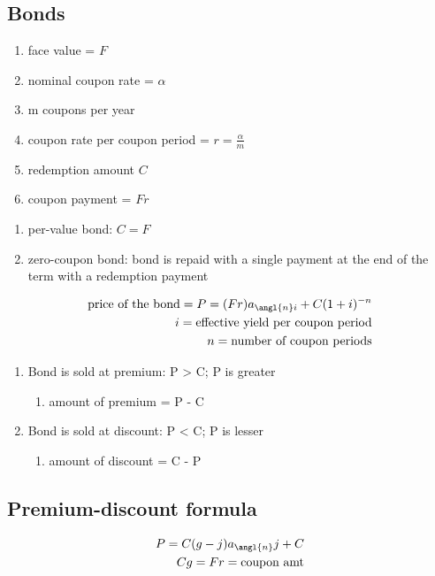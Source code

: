 \documentclass[12pt]{article}
\begin{document}
\subsection{Bonds}
\begin{enumerate}
	\item face value = $F$
	\item nominal coupon rate = $\alpha$
	\item m coupons per year 
	\item coupon rate per coupon period = $r = \frac{\alpha}{m}$
	\item redemption amount $C$
	\item coupon payment = $Fr$
	
\end{enumerate}
\begin{enumerate}
	\item per-value bond: $C = F$
	\item zero-coupon bond: bond is repaid with a single payment at the end of the term with a redemption payment 
\end{enumerate}
\begin{align}
	\text{price of the bond} = P = (Fr)a_{\angl{n}i} + C(1+i)^{-n} \nonumber \\
	i = \text{effective yield per coupon period} \nonumber \\
	n = \text{number of coupon periods} \nonumber
\end{align}
\begin{enumerate}
	\item Bond is sold at premium: P > C; P is greater
	\begin{enumerate}
		\item amount of premium = P - C
	\end{enumerate}
	\item Bond is sold at discount: P < C; P is lesser 
	\begin{enumerate}
		\item amount of discount = C - P
	\end{enumerate}
\end{enumerate}
\subsection{Premium-discount formula}
\begin{align}
	P = C(g-j)a_\angl{n}j + C \nonumber \\
	Cg = Fr = \text{coupon amt} \nonumber
\end{align}
\end{document}
